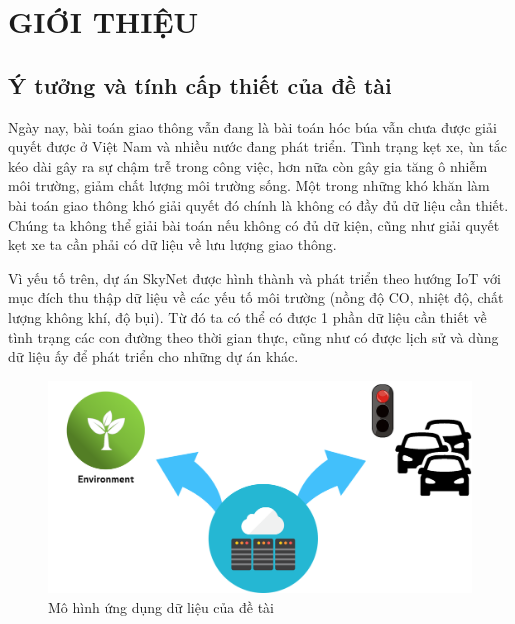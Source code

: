 
\chapter{GIỚI THIỆU}  %

\ifpdf
    \graphicspath{{Chapter1/Figs/Raster/}{Chapter1/Figs/PDF/}{Chapter1/Figs/}}
\else
    \graphicspath{{Chapter1/Figs/Vector/}{Chapter1/Figs/}}
\fi


\section{Ý tưởng và tính cấp thiết của đề tài}\label{section1.1}

Ngày nay, bài toán giao thông vẫn đang là bài toán hóc búa vẫn chưa được giải quyết được ở Việt Nam và nhiều nước đang phát triển. Tình trạng kẹt xe, ùn tắc kéo dài gây ra sự chậm trễ trong công việc, hơn nữa còn  gây gia tăng ô nhiễm môi trường, giảm chất lượng môi trường sống. Một trong những khó khăn làm bài toán giao thông khó giải quyết đó chính là không có đầy đủ dữ liệu cần thiết. Chúng ta không thể giải bài toán nếu không có đủ dữ kiện, cũng như giải quyết kẹt xe ta cần phải có dữ liệu về lưu lượng giao thông.

Vì yếu tố trên, dự án SkyNet được hình thành và phát triển theo hướng IoT với mục đích thu thập dữ liệu về các yếu tố môi trường (nồng độ CO, nhiệt độ, chất lượng không khí, độ bụi). Từ đó ta có thể có được 1 phần dữ liệu cần thiết về tình trạng các con đường theo thời gian thực, cũng như có được lịch sử và dùng dữ liệu ấy để phát triển cho những dự án khác.

\begin{figure}[H] 
\centering    
\includegraphics[width=1.0\textwidth]{pic1}
\caption[Mô hình ứng dụng dữ liệu của đề tài]{Mô hình ứng dụng dữ liệu của đề tài}
\label{fig:pic1}
\end{figure}

